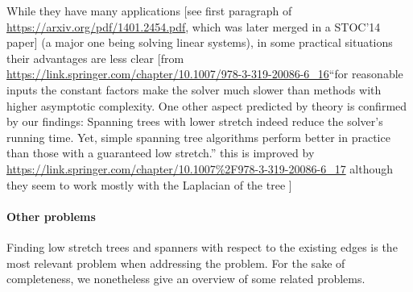 

While they have many applications [see first paragraph of \url{https://arxiv.org/pdf/1401.2454.pdf},
which was later merged in a STOC'14 paper] (a major one being solving linear systems), in some
practical situations their advantages are less clear [from
\url{https://link.springer.com/chapter/10.1007/978-3-319-20086-6_16}\enquote{for reasonable inputs
the constant factors make the solver much slower than methods with higher asymptotic complexity.
One other aspect predicted by theory is confirmed by our findings: Spanning trees with lower
stretch indeed reduce the solver's running time. Yet, simple spanning tree algorithms perform
better in practice than those with a guaranteed low stretch.} this is improved by
\url{https://link.springer.com/chapter/10.1007%2F978-3-319-20086-6_17} although they seem to work
	mostly with the Laplacian of the tree ]
\fi

\paragraph{Other problems}

Finding low stretch trees and spanners with respect to the existing edges is the most relevant
problem when addressing the \esp{} problem. For the sake of completeness, we nonetheless give an
overview of some related problems.


